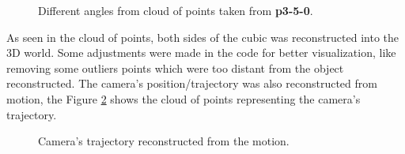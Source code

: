 \documentclass[12pt,a4paper]{article}
\begin{document}
\begin{figure}[!h]
{{			
		}
		\label{fig:3dpoints3}
	}
	\caption{Different angles from cloud of points taken from \textbf{p3-5-0}.}
	\label{fig:3dpoints}
\end{figure}

As seen in the cloud of points, both sides of the cubic was reconstructed into the 3D world. Some adjustments were made in the code for better visualization, like removing some outliers points which were too distant from the object reconstructed. The camera's position/trajectory was also reconstructed from motion, the Figure \ref{fig:3dcamera} shows the cloud of points representing the camera's trajectory.

\begin{figure}[!h]
	\centering
	{
		\setlength{\fboxsep}{1pt}
		\setlength{\fboxrule}{1pt}
	}
	\caption{Camera's trajectory reconstructed from the motion.}
	\label{fig:3dcamera}
\end{figure}
\end{document}
